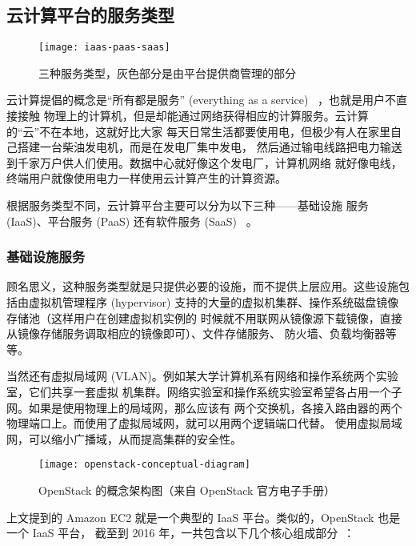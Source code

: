 \subsection{云计算平台的服务类型}

\begin{figure}[h]
    \centering
    \texttt{[image: iaas-paas-saas]}
    \caption{三种服务类型，灰色部分是由平台提供商管理的部分}
\end{figure}

云计算提倡的概念是“所有都是服务”
 (everything as a service) ~\cite{cloud-and-openstack}，也就是用户不直接接触
物理上的计算机，但是却能通过网络获得相应的计算服务。云计算的“云”不在本地，这就好比大家
每天日常生活都要使用电，但极少有人在家里自己搭建一台柴油发电机，而是在发电厂集中发电，
然后通过输电线路把电力输送到千家万户供人们使用。数据中心就好像这个发电厂，计算机网络
就好像电线，终端用户就像使用电力一样使用云计算产生的计算资源。

根据服务类型不同，云计算平台主要可以分为以下三种——基础设施
服务 (IaaS)、平台服务 (PaaS) 还有软件服务 (SaaS) ~\cite{types-of-cloud}。

\subsubsection{基础设施服务}
\label{subsubsec:iaas}

顾名思义，这种服务类型就是只提供必要的设施，而不提供上层应用。这些设施包括由虚拟机管理程序
 (hypervisor) 支持的大量的虚拟机集群、操作系统磁盘镜像存储池（这样用户在创建虚拟机实例的
时候就不用联网从镜像源下载镜像，直接从镜像存储服务调取相应的镜像即可）、文件存储服务、
防火墙、负载均衡器等等。

当然还有虚拟局域网 (VLAN)。例如某大学计算机系有网络和操作系统两个实验室，它们共享一套虚拟
机集群。网络实验室和操作系统实验室希望各占用一个子网。如果是使用物理上的局域网，那么应该有
两个交换机，各接入路由器的两个物理端口上。而使用了虚拟局域网，就可以用两个逻辑端口代替。
使用虚拟局域网，可以缩小广播域，从而提高集群的安全性。

\begin{figure}[h]
    \centering
    \texttt{[image: openstack-conceptual-diagram]}
    \caption{OpenStack 的概念架构图（来自 OpenStack 官方电子手册）}
\end{figure}

上文提到的 Amazon EC2 就是一个典型的 IaaS 平台。类似的，OpenStack 也是一个 IaaS 平台，
截至到 2016 年，一共包含以下几个核心组成部分~\cite{openstack}：

